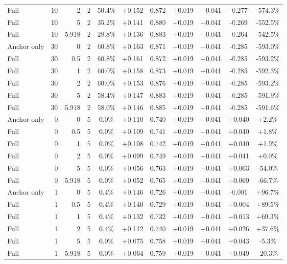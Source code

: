 \begin{table}[htbp]
\begin{tabular}{lrrrccccccc}
Full & 10 & 2 & 2 & 50.4\% & +0.152 & 0.872 & +0.019 & +0.041 & -0.277 & -574.3\% \\
Full & 10 & 5 & 2 & 35.2\% & +0.141 & 0.880 & +0.019 & +0.041 & -0.269 & -552.5\% \\
Full & 10 & 5.918 & 2 & 28.8\% & +0.136 & 0.883 & +0.019 & +0.041 & -0.264 & -542.5\% \\
Anchor only & 30 & 0 & 2 & 60.8\% & +0.163 & 0.871 & +0.019 & +0.041 & -0.285 & -593.0\% \\
Full & 30 & 0.5 & 2 & 60.8\% & +0.161 & 0.872 & +0.019 & +0.041 & -0.285 & -593.2\% \\
Full & 30 & 1 & 2 & 60.0\% & +0.158 & 0.873 & +0.019 & +0.041 & -0.285 & -592.3\% \\
Full & 30 & 2 & 2 & 60.0\% & +0.153 & 0.876 & +0.019 & +0.041 & -0.285 & -593.2\% \\
Full & 30 & 5 & 2 & 58.4\% & +0.147 & 0.883 & +0.019 & +0.041 & -0.285 & -591.9\% \\
Full & 30 & 5.918 & 2 & 58.0\% & +0.146 & 0.885 & +0.019 & +0.041 & -0.285 & -591.6\% \\
Anchor only & 0 & 0 & 5 & 0.0\% & +0.110 & 0.740 & +0.019 & +0.041 & +0.040 & +2.2\% \\
Full & 0 & 0.5 & 5 & 0.0\% & +0.109 & 0.741 & +0.019 & +0.041 & +0.040 & +1.8\% \\
Full & 0 & 1 & 5 & 0.0\% & +0.108 & 0.742 & +0.019 & +0.041 & +0.040 & +1.9\% \\
Full & 0 & 2 & 5 & 0.0\% & +0.099 & 0.749 & +0.019 & +0.041 & +0.041 & +0.0\% \\
Full & 0 & 5 & 5 & 0.0\% & +0.056 & 0.763 & +0.019 & +0.041 & +0.063 & -54.0\% \\
Full & 0 & 5.918 & 5 & 0.0\% & +0.052 & 0.765 & +0.019 & +0.041 & +0.069 & -66.7\% \\
Anchor only & 1 & 0 & 5 & 0.4\% & +0.146 & 0.726 & +0.019 & +0.041 & -0.001 & +96.7\% \\
Full & 1 & 0.5 & 5 & 0.4\% & +0.140 & 0.729 & +0.019 & +0.041 & +0.004 & +89.5\% \\
Full & 1 & 1 & 5 & 0.4\% & +0.132 & 0.732 & +0.019 & +0.041 & +0.013 & +69.3\% \\
Full & 1 & 2 & 5 & 0.4\% & +0.112 & 0.740 & +0.019 & +0.041 & +0.026 & +37.6\% \\
Full & 1 & 5 & 5 & 0.0\% & +0.075 & 0.758 & +0.019 & +0.041 & +0.043 & -5.3\% \\
Full & 1 & 5.918 & 5 & 0.0\% & +0.064 & 0.759 & +0.019 & +0.041 & +0.049 & -20.3\% \\

\end{tabular}
\end{table}
